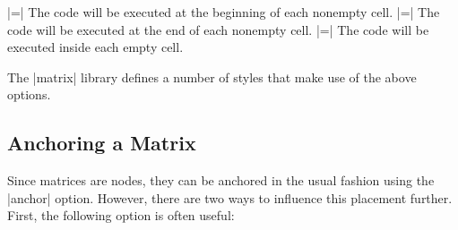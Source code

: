 \begin{itemize}
  |=|
  The code will be executed at the beginning of each nonempty cell.
  |=|
  The code will be executed at the end of each nonempty cell.
  |=|
  The code will be executed inside each empty cell.

\begin{codeexample}[]
\end{codeexample}
\begin{codeexample}[]
\end{codeexample}
\end{itemize}

The |matrix| library defines a number of styles that make use of the
above options.





\subsection{Anchoring a Matrix}

Since matrices are nodes, they can be anchored in the usual fashion
using the |anchor| option. However, there are two ways to influence
this placement further. First, the following option is often useful:

